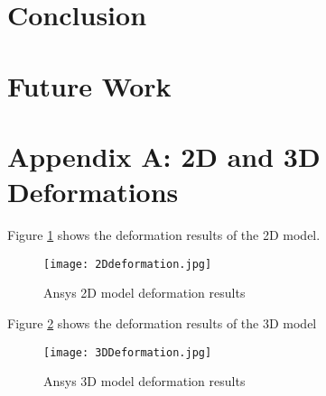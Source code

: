 \documentclass[a4paper]{article}
\begin{document}
\section{Conclusion}
\section{Future Work}

\newpage


\newpage
\section{Appendix A: 2D and 3D Deformations}
Figure \ref{fig:2DDeform} shows the deformation results of the 2D model. 
\begin{figure}[h!]
	\centering
	\texttt{[image: 2Ddeformation.jpg]}
	\caption{\label{fig:2DDeform} Ansys 2D model deformation results}
\end{figure} 

\noindent Figure \ref{fig:3DDeform} shows the deformation results of the 3D model
\begin{figure}[h!]
	\centering
	\texttt{[image: 3DDeformation.jpg]}
	\caption{\label{fig:3DDeform} Ansys 3D model deformation results }
\end{figure} 
\end{document}
